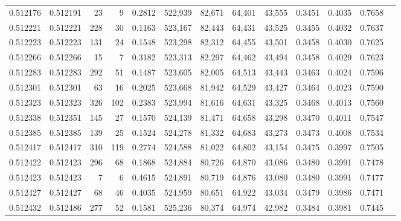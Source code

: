 \begin{tabular}{rrrrrrrrrrrrr}
0.512176 & 0.512191 &    23 &     9 &                                     0.2812 & 522,939 &  82,671 &  64,401 &  43,555 & 0.3451 & 0.4035 & 0.7658 \\
0.512221 & 0.512221 &   228 &    30 &                                     0.1163 & 523,167 &  82,443 &  64,431 &  43,525 & 0.3455 & 0.4032 & 0.7637 \\
0.512223 & 0.512223 &   131 &    24 &                                     0.1548 & 523,298 &  82,312 &  64,455 &  43,501 & 0.3458 & 0.4030 & 0.7625 \\
0.512266 & 0.512266 &    15 &     7 &                                     0.3182 & 523,313 &  82,297 &  64,462 &  43,494 & 0.3458 & 0.4029 & 0.7623 \\
0.512283 & 0.512283 &   292 &    51 &                                     0.1487 & 523,605 &  82,005 &  64,513 &  43,443 & 0.3463 & 0.4024 & 0.7596 \\
0.512301 & 0.512301 &    63 &    16 &                                     0.2025 & 523,668 &  81,942 &  64,529 &  43,427 & 0.3464 & 0.4023 & 0.7590 \\
0.512323 & 0.512323 &   326 &   102 &                                     0.2383 & 523,994 &  81,616 &  64,631 &  43,325 & 0.3468 & 0.4013 & 0.7560 \\
0.512338 & 0.512351 &   145 &    27 &                                     0.1570 & 524,139 &  81,471 &  64,658 &  43,298 & 0.3470 & 0.4011 & 0.7547 \\
0.512385 & 0.512385 &   139 &    25 &                                     0.1524 & 524,278 &  81,332 &  64,683 &  43,273 & 0.3473 & 0.4008 & 0.7534 \\
0.512417 & 0.512417 &   310 &   119 &                                     0.2774 & 524,588 &  81,022 &  64,802 &  43,154 & 0.3475 & 0.3997 & 0.7505 \\
0.512422 & 0.512423 &   296 &    68 &                                     0.1868 & 524,884 &  80,726 &  64,870 &  43,086 & 0.3480 & 0.3991 & 0.7478 \\
0.512423 & 0.512423 &     7 &     6 &                                     0.4615 & 524,891 &  80,719 &  64,876 &  43,080 & 0.3480 & 0.3991 & 0.7477 \\
0.512427 & 0.512427 &    68 &    46 &                                     0.4035 & 524,959 &  80,651 &  64,922 &  43,034 & 0.3479 & 0.3986 & 0.7471 \\
0.512432 & 0.512486 &   277 &    52 &                                     0.1581 & 525,236 &  80,374 &  64,974 &  42,982 & 0.3484 & 0.3981 & 0.7445 \\

\end{tabular}
